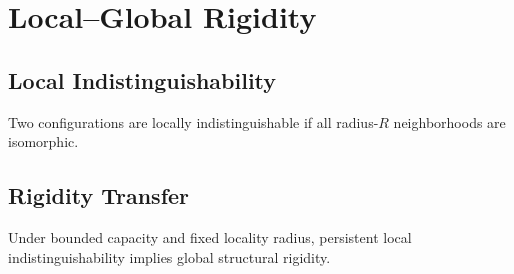 \chapter{Local--Global Rigidity}

\section{Local Indistinguishability}

Two configurations are locally indistinguishable if all radius-\(R\) neighborhoods are isomorphic.

\section{Rigidity Transfer}

\begin{theorem}
Under bounded capacity and fixed locality radius, persistent local indistinguishability implies global structural rigidity.
\end{theorem}
